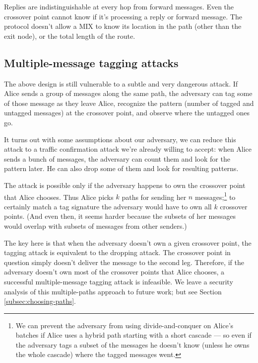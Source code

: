 \documentclass{llncs}
\begin{document}
Replies are indistinguishable at every hop from forward messages. Even the
crossover point cannot know if it's processing a reply or forward message.
The protocol doesn't allow a MIX to know its location in the path (other
than the exit node), or the total length of the route.

\subsection{Multiple-message tagging attacks}

The above design is still vulnerable to a subtle and very dangerous
attack. If Alice sends a group of messages along the same path, the
adversary can tag some of those message as they leave Alice, recognize
the pattern (number of tagged and untagged messages) at the crossover
point, and observe where the untagged ones go.

It turns out with some assumptions about our adversary, we can reduce
this attack to a traffic confirmation attack we're already willing to
accept: when Alice sends a bunch of messages, the adversary can count
them and look for the pattern later. He can also drop some of them and
look for resulting patterns.

The attack is possible only if the adversary happens to own the crossover
point that Alice chooses.
Thus Alice picks $k$ paths for sending her $n$
messages;\footnote{
  We can prevent the adversary from using divide-and-conquer on Alice's
  batches if Alice uses a hybrid path starting with a short cascade ---
  so even if the adversary tags a subset of the messages he doesn't know
  (unless he owns the whole cascade) where the tagged messages went.
}
to certainly match a tag signature the adversary would have to own all $k$
crossover points. (And even then, it seems harder because the subsets of
her messages would overlap with subsets of messages from other senders.)

The key here is that when the adversary doesn't own a given crossover
point, the tagging attack is equivalent to the dropping attack. The
crossover point in question simply doesn't deliver the message to the
second leg. Therefore, if the adversary doesn't own most of the crossover
points that Alice chooses, a successful multiple-message tagging attack is
infeasible. We leave a security analysis of this multiple-paths approach
to future work; but see Section \ref{subsec:choosing-paths}.
\end{document}
